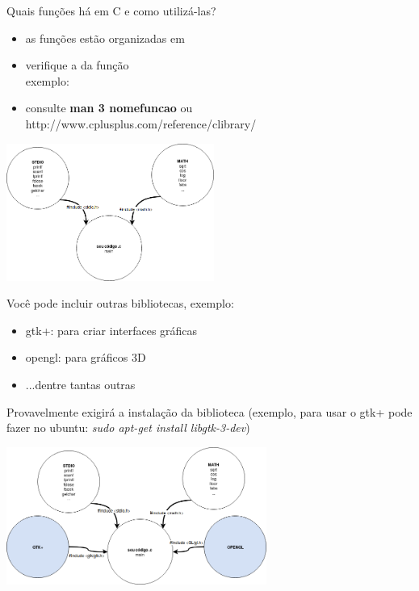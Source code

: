 \documentclass[portuguese,10pt,xcolor=table]{bredelebeamer}
\begin{document}
	\begin{frame}
		Quais funções há em C e como utilizá-las?
				\begin{itemize}
					\item as funções estão organizadas em 
					\item verifique a  da função\\
						exemplo:        

					\item consulte \textbf{man 3 nomefuncao} ou http://www.cplusplus.com/reference/clibrary/
				\end{itemize}
			\includegraphics[height=4.5cm]{includes.png}
	\end{frame} 
	\begin{frame}
		Você pode incluir outras bibliotecas, exemplo:
				\begin{itemize}
					\item gtk+: para criar interfaces gráficas
					\item opengl: para gráficos 3D
					\item ...dentre tantas outras
				\end{itemize}
				Provavelmente exigirá a instalação da biblioteca (exemplo, para usar o gtk+ pode fazer no ubuntu: \textit{sudo apt-get install libgtk-3-dev})
			
			\includegraphics[height=4.5cm]{includes2.png}
	\end{frame}




\end{document}
